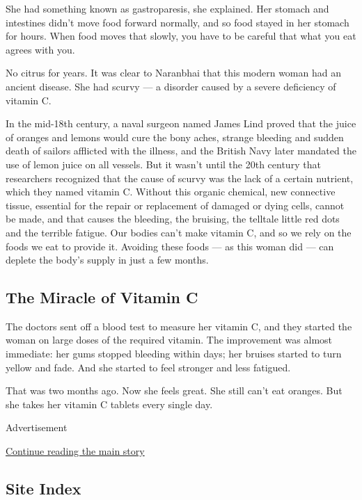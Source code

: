 She had something known as gastroparesis, she explained. Her stomach and
intestines didn't move food forward normally, and so food stayed in her
stomach for hours. When food moves that slowly, you have to be careful
that what you eat agrees with you.

No citrus for years. It was clear to Naranbhai that this modern woman
had an ancient disease. She had scurvy --- a disorder caused by a severe
deficiency of vitamin C.

In the mid-18th century, a naval surgeon named James Lind proved that
the juice of oranges and lemons would cure the bony aches, strange
bleeding and sudden death of sailors afflicted with the illness, and the
British Navy later mandated the use of lemon juice on all vessels. But
it wasn't until the 20th century that researchers recognized that the
cause of scurvy was the lack of a certain nutrient, which they named
vitamin C. Without this organic chemical, new connective tissue,
essential for the repair or replacement of damaged or dying cells,
cannot be made, and that causes the bleeding, the bruising, the telltale
little red dots and the terrible fatigue. Our bodies can't make vitamin
C, and so we rely on the foods we eat to provide it. Avoiding these
foods --- as this woman did --- can deplete the body's supply in just a
few months.

\hypertarget{the-miracle-of-vitamin-c}{%
\subsection{\texorpdfstring{\textbf{The Miracle of Vitamin
C}}{The Miracle of Vitamin C}}\label{the-miracle-of-vitamin-c}}

The doctors sent off a blood test to measure her vitamin C, and they
started the woman on large doses of the required vitamin. The
improvement was almost immediate: her gums stopped bleeding within days;
her bruises started to turn yellow and fade. And she started to feel
stronger and less fatigued.

That was two months ago. Now she feels great. She still can't eat
oranges. But she takes her vitamin C tablets every single day.

Advertisement

\protect\hyperlink{after-bottom}{Continue reading the main story}

\hypertarget{site-index}{%
\subsection{Site Index}\label{site-index}}

